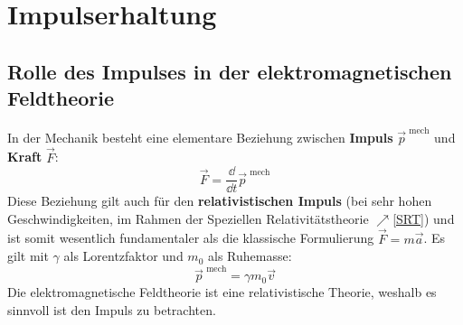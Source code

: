  \section{Impulserhaltung}
 \subsection{Rolle des Impulses in der elektromagnetischen Feldtheorie}
In der Mechanik besteht eine elementare Beziehung zwischen \textbf{Impuls} \(\vec{p}^\text{ mech}\) und \textbf{Kraft} \(\vec{F} \):
\begin{equation}\label{krafimp}
	\vec{F}  = \frac{\dd}{\dd t} \vec{p}^\text{ mech}
\end{equation}
 Diese Beziehung gilt auch für den \textbf{relativistischen Impuls} (bei sehr hohen Geschwindigkeiten, im Rahmen der Speziellen Relativitätstheorie $\nearrow$\ref{SRT}) und ist somit wesentlich fundamentaler als die klassische Formulierung \(\vec{F}  = m\vec{a}\). Es gilt mit $\gamma$ als Lorentzfaktor und $m_0$ als Ruhemasse:  \begin{equation}
 	\vec{p}^\text{ mech} = \gamma m_0 \vec{v}
 	\end{equation}
 Die elektromagnetische Feldtheorie ist eine relativistische Theorie, weshalb es sinnvoll ist den Impuls zu betrachten.

